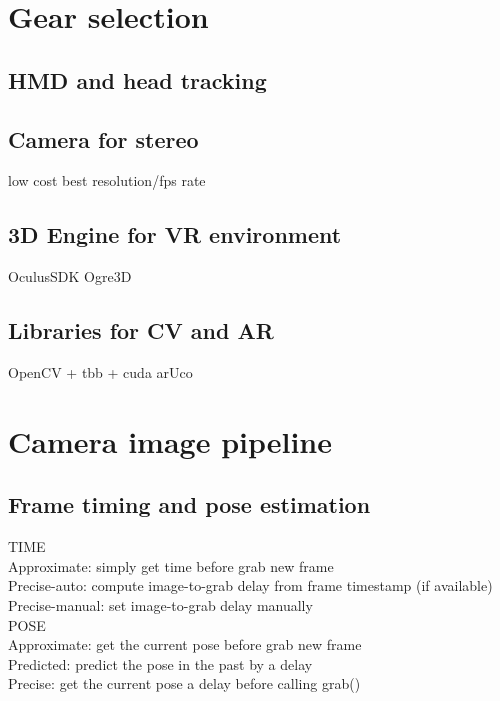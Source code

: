


\section{Gear selection}

\subsection{HMD and head tracking}

\subsection{Camera for stereo}
low cost
best resolution/fps rate

\subsection{3D Engine for VR environment}
OculusSDK
Ogre3D

\subsection{Libraries for CV and AR}
OpenCV + tbb + cuda
arUco





\section{Camera image pipeline}

\subsection{Frame timing and pose estimation}
TIME\\
Approximate: simply get time before grab new frame\\
Precise-auto: compute image-to-grab delay from frame timestamp (if available)\\
Precise-manual: set image-to-grab delay manually\\
POSE\\
Approximate: get the current pose before grab new frame\\
Predicted: predict the pose in the past by a delay\\
Precise: get the current pose a delay before calling grab()\\
